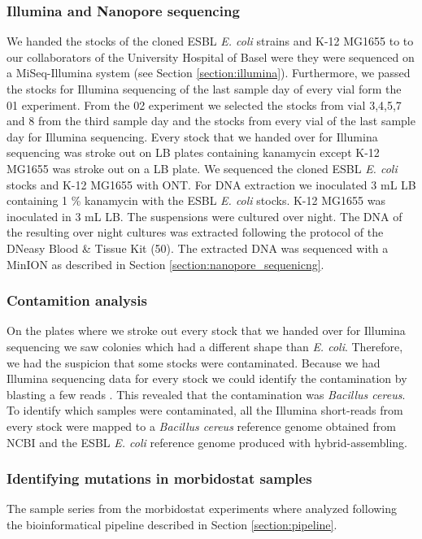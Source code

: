 \subsubsection{Illumina and Nanopore sequencing}
We handed the stocks of the cloned ESBL \textit{E. coli} strains and K-12 MG1655 to to our collaborators of the University Hospital of Basel were they were sequenced on a MiSeq-Illumina system (see Section \ref{section:illumina}).
Furthermore, we passed the stocks for Illumina sequencing of the last sample day of every vial form the 01 experiment. 
From the 02 experiment we selected the stocks from vial 3,4,5,7 and 8 from the third sample day and the stocks from every vial of the last sample day for Illumina sequencing. Every stock that we handed over for Illumina sequencing was stroke out on LB plates containing kanamycin except K-12 MG1655 was stroke out on a LB plate.
We sequenced the cloned ESBL \textit{E. coli} stocks and K-12 MG1655 with ONT. For DNA extraction we inoculated 3 mL LB containing 1 \% kanamycin with the ESBL \textit{E. coli} stocks. K-12 MG1655 was inoculated in 3 mL LB. The suspensions were cultured over night. The DNA of the resulting over night cultures was extracted following the protocol of the DNeasy Blood \& Tissue Kit (50). The extracted DNA was sequenced with a MinION as described in Section \ref{section:nanopore_sequenicng}. 

\subsubsection{Contamition analysis}
On the plates where we stroke out every stock that we handed over for Illumina sequencing we saw colonies which had a different shape than \textit{E. coli}. Therefore, we had the suspicion that some stocks were contaminated. Because we had Illumina sequencing data for every stock we could identify the contamination by blasting a few reads \cite{madden_blast_2003}. This revealed that the contamination was \textit{Bacillus cereus}. To identify which samples were contaminated, all the Illumina short-reads from every stock  were mapped to a \textit{Bacillus cereus} reference genome obtained from NCBI \cite{noauthor_bacillus_nodate} and the ESBL \textit{E. coli} reference genome produced with hybrid-assembling.

\subsubsection{Identifying mutations in morbidostat samples}
The sample series from the morbidostat experiments where analyzed following the bioinformatical pipeline described in Section \ref{section:pipeline}. 
